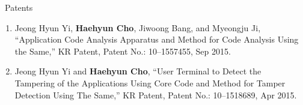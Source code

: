 \documentclass{resume} %
\begin{document}
\begin{rSection}{\faGenderless~Patents}
	
    \begin{enumerate}[leftmargin=0pt]
		\item Jeong Hyun Yi, \textbf{Haehyun Cho}, Jiwoong Bang, and Myeongju Ji,
		``Application Code Analysis Apparatus and Method for Code Analysis Using the Same,'' KR Patent, 
		Patent No.: 10--1557455, Sep 2015.

		\item Jeong Hyun Yi and \textbf{Haehyun Cho}, 
		``User Terminal to Detect the Tampering of the Applications Using Core Code and Method for Tamper Detection Using The Same,'' KR Patent, 
		Patent No.: 10--1518689, Apr 2015.
	\end{enumerate}
	
	\vspace{3mm}
\end{rSection}


\end{document}

